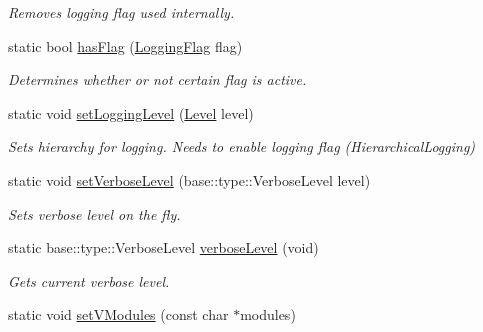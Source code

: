 \begin{DoxyCompactItemize}
\begin{DoxyCompactList}\small\item\em Removes logging flag used internally. \end{DoxyCompactList}\item 
\hypertarget{a00049_a591a45565c1eb7073ec3a979df8b5a4c}{}static bool \hyperlink{a00049_a591a45565c1eb7073ec3a979df8b5a4c}{has\+Flag} (\hyperlink{a00183_a2784aacd04cb7816ac1c0b20fcbf83cb}{Logging\+Flag} flag)\label{a00049_a591a45565c1eb7073ec3a979df8b5a4c}

\begin{DoxyCompactList}\small\item\em Determines whether or not certain flag is active. \end{DoxyCompactList}\item 
\hypertarget{a00049_afbee019d722fef5148d8355f45ba7993}{}static void \hyperlink{a00049_afbee019d722fef5148d8355f45ba7993}{set\+Logging\+Level} (\hyperlink{a00183_ab0ac6091262344c52dd2d3ad099e8e36}{Level} level)\label{a00049_afbee019d722fef5148d8355f45ba7993}

\begin{DoxyCompactList}\small\item\em Sets hierarchy for logging. Needs to enable logging flag (Hierarchical\+Logging) \end{DoxyCompactList}\item 
\hypertarget{a00049_a826b238fe4f3719305a2d19f0c121fa0}{}static void \hyperlink{a00049_a826b238fe4f3719305a2d19f0c121fa0}{set\+Verbose\+Level} (base\+::type\+::\+Verbose\+Level level)\label{a00049_a826b238fe4f3719305a2d19f0c121fa0}

\begin{DoxyCompactList}\small\item\em Sets verbose level on the fly. \end{DoxyCompactList}\item 
\hypertarget{a00049_ad4840bb4b6b80746a2212cf3cc058142}{}static base\+::type\+::\+Verbose\+Level \hyperlink{a00049_ad4840bb4b6b80746a2212cf3cc058142}{verbose\+Level} (void)\label{a00049_ad4840bb4b6b80746a2212cf3cc058142}

\begin{DoxyCompactList}\small\item\em Gets current verbose level. \end{DoxyCompactList}\item 
\hypertarget{a00049_acbc5e2cef230331c57f364852a671507}{}static void \hyperlink{a00049_acbc5e2cef230331c57f364852a671507}{set\+V\+Modules} (const char $\ast$modules)\label{a00049_acbc5e2cef230331c57f364852a671507}


\end{DoxyCompactItemize}
